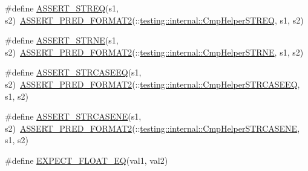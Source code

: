 \begin{DoxyCompactItemize}
\item 
\#define \mbox{\hyperlink{_obj__test_2lib_2googletest-release-1_88_81_2googletest_2include_2gtest_2gtest_8h_a74f4189ea570bab9a65d47104659ef9c}{A\+S\+S\+E\+R\+T\+\_\+\+S\+T\+R\+EQ}}(s1,  s2)~\mbox{\hyperlink{_obj__test_2lib_2googletest-release-1_88_81_2googletest_2include_2gtest_2gtest__pred__impl_8h_ac452685a1a98ea3d96eb956a062ee210}{A\+S\+S\+E\+R\+T\+\_\+\+P\+R\+E\+D\+\_\+\+F\+O\+R\+M\+A\+T2}}(\+::\mbox{\hyperlink{namespacetesting_1_1internal_a711a396ed8f636ecd14a850a89d181b6}{testing\+::internal\+::\+Cmp\+Helper\+S\+T\+R\+EQ}}, s1, s2)
\item 
\#define \mbox{\hyperlink{_obj__test_2lib_2googletest-release-1_88_81_2googletest_2include_2gtest_2gtest_8h_a3d679660ac1b2f9f6e6c7608452af923}{A\+S\+S\+E\+R\+T\+\_\+\+S\+T\+R\+NE}}(s1,  s2)~\mbox{\hyperlink{_obj__test_2lib_2googletest-release-1_88_81_2googletest_2include_2gtest_2gtest__pred__impl_8h_ac452685a1a98ea3d96eb956a062ee210}{A\+S\+S\+E\+R\+T\+\_\+\+P\+R\+E\+D\+\_\+\+F\+O\+R\+M\+A\+T2}}(\+::\mbox{\hyperlink{namespacetesting_1_1internal_af2d31c77ce73e1003a64bd7ca3564bbe}{testing\+::internal\+::\+Cmp\+Helper\+S\+T\+R\+NE}}, s1, s2)
\item 
\#define \mbox{\hyperlink{_obj__test_2lib_2googletest-release-1_88_81_2googletest_2include_2gtest_2gtest_8h_a58847dd696200a3268361401dfcd0fa0}{A\+S\+S\+E\+R\+T\+\_\+\+S\+T\+R\+C\+A\+S\+E\+EQ}}(s1,  s2)~\mbox{\hyperlink{_obj__test_2lib_2googletest-release-1_88_81_2googletest_2include_2gtest_2gtest__pred__impl_8h_ac452685a1a98ea3d96eb956a062ee210}{A\+S\+S\+E\+R\+T\+\_\+\+P\+R\+E\+D\+\_\+\+F\+O\+R\+M\+A\+T2}}(\+::\mbox{\hyperlink{namespacetesting_1_1internal_a30dfeb01f1bc8087c7d05205d5fa75c1}{testing\+::internal\+::\+Cmp\+Helper\+S\+T\+R\+C\+A\+S\+E\+EQ}}, s1, s2)
\item 
\#define \mbox{\hyperlink{_obj__test_2lib_2googletest-release-1_88_81_2googletest_2include_2gtest_2gtest_8h_ac3d2c3836b103068a050f32585b2aaad}{A\+S\+S\+E\+R\+T\+\_\+\+S\+T\+R\+C\+A\+S\+E\+NE}}(s1,  s2)~\mbox{\hyperlink{_obj__test_2lib_2googletest-release-1_88_81_2googletest_2include_2gtest_2gtest__pred__impl_8h_ac452685a1a98ea3d96eb956a062ee210}{A\+S\+S\+E\+R\+T\+\_\+\+P\+R\+E\+D\+\_\+\+F\+O\+R\+M\+A\+T2}}(\+::\mbox{\hyperlink{namespacetesting_1_1internal_a7e31d489f06ab8f6a81a7729f0c377e7}{testing\+::internal\+::\+Cmp\+Helper\+S\+T\+R\+C\+A\+S\+E\+NE}}, s1, s2)
\item 
\#define \mbox{\hyperlink{_obj__test_2lib_2googletest-release-1_88_81_2googletest_2include_2gtest_2gtest_8h_a981e552322fb084042d02d6dfa9860ca}{E\+X\+P\+E\+C\+T\+\_\+\+F\+L\+O\+A\+T\+\_\+\+EQ}}(val1,  val2)

\end{DoxyCompactItemize}

